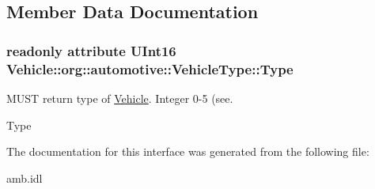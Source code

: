 \subsection{Member Data Documentation}
\hypertarget{interfaceVehicle_1_1org_1_1automotive_1_1VehicleType_a9c6dc007ca2a36b2cc392214078080f8}{
\subsubsection[{Type}]{\setlength{\rightskip}{0pt plus 5cm}readonly attribute U\-Int16 Vehicle\-::org\-::automotive\-::\-Vehicle\-Type\-::\-Type}}\label{interfaceVehicle_1_1org_1_1automotive_1_1VehicleType_a9c6dc007ca2a36b2cc392214078080f8}


M\-U\-S\-T return type of \hyperlink{namespaceVehicle}{Vehicle}. Integer 0-\/5 (see. 

Type 

The documentation for this interface was generated from the following file\-:\begin{DoxyCompactItemize}
\item 
amb.\-idl\end{DoxyCompactItemize}
